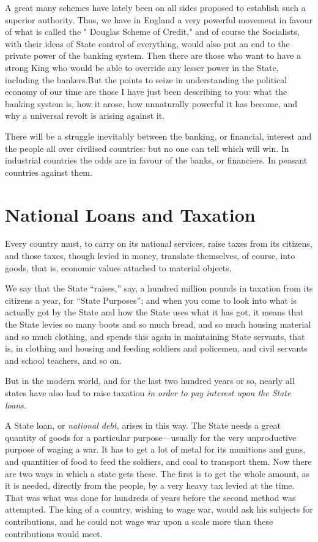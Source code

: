 \documentclass{book}
\begin{document}
A great many schemes have lately been on all sides proposed to establish such a superior authority. Thus, we have in England a very powerful movement in favour of what is called the " Douglas Scheme of Credit," and of course the Socialists, with their ideas of State control of everything, would also put an end to the private power of the banking system. Then there are those who want to have a strong King who would be able to override any lesser power in the State, including the bankers.\footnotemark[1] But the points to seize in understanding the political economy of our time are those I have just been describing to you: what the banking system is, how it arose, how unnaturally powerful it has become, and why a universal revolt is arising against it.

There will be a struggle inevitably between the banking, or financial, interest and the people all over civilised countries: but no one can tell which will win. In industrial countries the odds are in favour of the banks, or financiers. In peasant countries against them.

\chapter*{National Loans and Taxation}
\label{chapter-18}
Every country must, to carry on its national services, raise taxes from its citizens, and those taxes, though levied in money, translate themselves, of course, into goods, that is, economic values attached to material objects.

We say that the State “raises,” say, a hundred million pounds in taxation from its citizens a year, for “State Purposes”; and when you come to look into what is actually got by the State and how the State uses what it has got, it means that the State levies so many boots and so much bread, and so much housing material and so much clothing, and spends this again in maintaining State servants, that is, in clothing and housing and feeding soldiers and policemen, and civil servants and school teachers, and so on.

But in the modern world, and for the last two hundred years or so, nearly all states have also had to raise taxation \emph{in order to pay interest upon the State loans.}

A State loan, or \emph{national debt,} arises in this way. The State needs a great quantity of goods for a particular purpose—usually for the very unproductive purpose of waging a war. It has to get a lot of metal for its munitions and guns, and quantities of food to feed the soldiers, and coal to transport them. Now there are two ways in which a state gets these. The first is to get the whole amount, as it is needed, directly from the people, by a very heavy tax levied at the time. That was what was done for hundreds of years before the second method was attempted. The king of a country, wishing to wage war, would ask his subjects for contributions, and he could not wage war upon a scale more than these contributions would meet.
\end{document}
